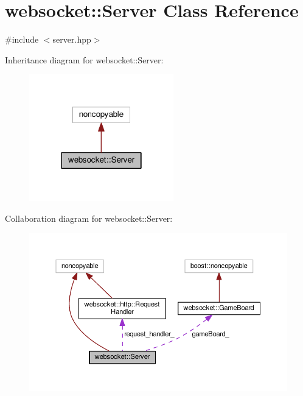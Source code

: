 \hypertarget{classwebsocket_1_1Server}{}\section{websocket\+:\+:Server Class Reference}
\label{classwebsocket_1_1Server}


{\ttfamily \#include $<$server.\+hpp$>$}



Inheritance diagram for websocket\+:\+:Server\+:
\nopagebreak
\begin{figure}[H]
\begin{center}
\leavevmode
\includegraphics[width=178pt]{classwebsocket_1_1Server__inherit__graph}
\end{center}
\end{figure}


Collaboration diagram for websocket\+:\+:Server\+:
\nopagebreak
\begin{figure}[H]
\begin{center}
\leavevmode
\includegraphics[width=350pt]{classwebsocket_1_1Server__coll__graph}
\end{center}
\end{figure}
